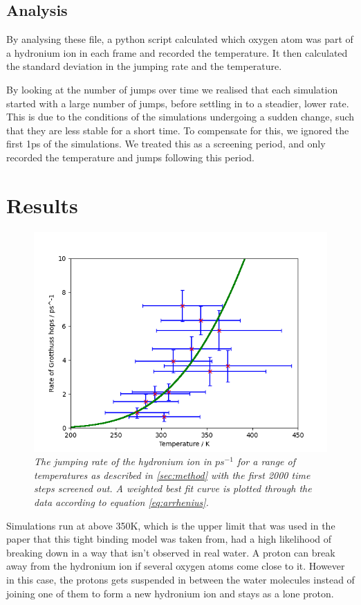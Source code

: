 \documentclass[reprint,]{revtex4-2}
\begin{document}
\subsection{Analysis}
By analysing these file, a python script calculated which oxygen atom was part of a hydronium ion in each frame and recorded the temperature. It then calculated the standard deviation in the jumping rate and the temperature. 

By looking at the number of jumps over time we realised that each simulation started with a large number of jumps, before settling in to a steadier, lower rate. This is due to the conditions of the simulations undergoing a sudden change, such that they are less stable for a short time. To compensate for this, we ignored the first 1ps of the simulations. We treated this as a screening period, and only recorded the temperature and jumps following this period.

\section{Results}

\begin{figure}[h]
	\centering
	\includegraphics[width=\linewidth]{figures/bestfitcurve.png}
	\caption{\textit{The jumping rate of the hydronium ion in $ps^{-1}$ for a range of temperatures as described in \ref{sec:method} with the first 2000 time steps screened out. A weighted best fit curve is plotted through the data according to equation \ref{eq:arrhenius}.}}
	\label{fig:bestfitcurve}	
\end{figure}
Simulations run at above 350K, which is the upper limit that was used in the paper that this tight binding model was taken from,\cite{Lozovoi2014} had a high likelihood of breaking down in a way that isn’t observed in real water.\cite{bell2013proton} A proton can break away from the hydronium ion if several oxygen atoms come close to it. However in this case, the protons gets suspended in between the water molecules instead of joining one of them to form a new hydronium ion and stays as a lone proton.
\end{document}
